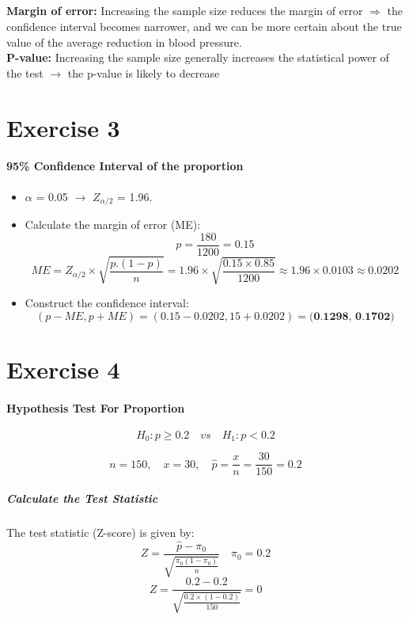 \documentclass[12pt]{article}
\begin{document}
	\subsection{}
		\textbf{Margin of error:} Increasing the sample size reduces the margin of error $\Rightarrow$ the confidence interval becomes narrower, and we can be more certain about the true value of the average reduction in blood pressure.\\
		\textbf{P-value:} Increasing the sample size generally increases the statistical power of the test $\rightarrow$ the p-value is likely to decrease		
	\section{Exercise 3}
		\paragraph{95\% Confidence Interval of the proportion}	
			\begin{itemize}
				\item $\alpha$ = 0.05 $\rightarrow$ $Z_{\alpha/2}$ = 1.96.
				
				\item Calculate the margin of error (ME):
				\[
				p = \frac{180}{1200} = 0.15
				\]
				\[
				ME = Z_{\alpha/2} \times \sqrt{\frac{p.(1-p)}{n}} = 1.96 \times \sqrt{\frac{0.15 \times 0.85}{1200}} \approx 1.96 \times 0.0103 \approx 0.0202
				\]
				
				\item Construct the confidence interval:\\
				\[
				(p - ME, p + ME) = (0.15 - 0.0202, 15 + 0.0202) = \textbf{(0.1298, 0.1702)}
				\]
			\end{itemize}	

	\section{Exercise 4}
	\paragraph{Hypothesis Test For Proportion}
	\[
	H_0: p \geq 0.2 \quad vs \quad H_1: p < 0.2
	\]

	\[
	n = 150, \quad x = 30, \quad \hat{p} = \frac{x}{n} = \frac{30}{150} = 0.2
	\]
	

	\subparagraph{Calculate the Test Statistic}

	The test statistic (Z-score) is given by:
	\[
	Z = \frac{\hat{p} - \pi_0}{\sqrt{\frac{\pi_0 (1 - \pi_0)}{n}}}
	\quad \pi_0 = 0.2 
	\]
	\[
	Z = \frac{0.2 - 0.2}{\sqrt{\frac{0.2 \times (1 - 0.2)}{150}}} = 0
	\]
	
\end{document}
